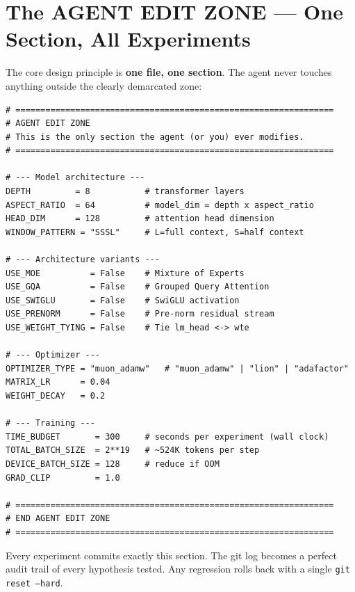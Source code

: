 \documentclass[12pt, a4paper]{article}
\newcommand{\code}[1]{\texttt{#1}}
\begin{document}
\section{The AGENT EDIT ZONE — One Section, All Experiments}

The core design principle is \textbf{one file, one section}. The agent never touches anything
outside the clearly demarcated zone:

\begin{tcolorbox}[codebox, title=train.py — AGENT EDIT ZONE]
\begin{lstlisting}[style=pythonstyle]
# ================================================================
# AGENT EDIT ZONE
# This is the only section the agent (or you) ever modifies.
# ================================================================

# --- Model architecture ---
DEPTH         = 8           # transformer layers
ASPECT_RATIO  = 64          # model_dim = depth x aspect_ratio
HEAD_DIM      = 128         # attention head dimension
WINDOW_PATTERN = "SSSL"     # L=full context, S=half context

# --- Architecture variants ---
USE_MOE          = False    # Mixture of Experts
USE_GQA          = False    # Grouped Query Attention
USE_SWIGLU       = False    # SwiGLU activation
USE_PRENORM      = False    # Pre-norm residual stream
USE_WEIGHT_TYING = False    # Tie lm_head <-> wte

# --- Optimizer ---
OPTIMIZER_TYPE = "muon_adamw"   # "muon_adamw" | "lion" | "adafactor"
MATRIX_LR      = 0.04
WEIGHT_DECAY   = 0.2

# --- Training ---
TIME_BUDGET       = 300     # seconds per experiment (wall clock)
TOTAL_BATCH_SIZE  = 2**19   # ~524K tokens per step
DEVICE_BATCH_SIZE = 128     # reduce if OOM
GRAD_CLIP         = 1.0

# ================================================================
# END AGENT EDIT ZONE
# ================================================================
\end{lstlisting}
\end{tcolorbox}

Every experiment commits exactly this section. The git log becomes a perfect audit trail
of every hypothesis tested. Any regression rolls back with a single \code{git reset
--hard}.

\end{document}
